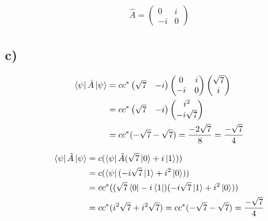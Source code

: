 \documentclass[norsk,a4paper,12pt]{article}
\begin{document}
		\begin{equation}
		\begin{aligned}
		\hat{A} = \begin{pmatrix}0 & i \\ -i & 0 \end{pmatrix}
		\end{aligned}
		\end{equation}
		
	\subsection*{c)}
	
		\begin{equation}
		\begin{aligned}
		\bra{\psi} \hat{A} \ket{\psi} &= cc^* \begin{pmatrix}\sqrt{7} & -i \end{pmatrix}
		\begin{pmatrix}0 & i \\ -i & 0 \end{pmatrix} \begin{pmatrix}\sqrt{7} \\ i \end{pmatrix} \\
		&= cc^* \begin{pmatrix}\sqrt{7} & -i \end{pmatrix}
		\begin{pmatrix}i^2 \\ -i\sqrt{7} \end{pmatrix} \\
		&= cc^* (-\sqrt{7} -\sqrt{7}) = \frac{-2\sqrt{7}}{8} = \frac{-\sqrt{7}}{4}
		\end{aligned}
		\end{equation}
		
		\begin{equation}
		\begin{aligned}
		\bra{\psi} \hat{A} \ket{\psi} &= c(\bra{\psi} \hat{A} (\sqrt{7} \ket{0} + i \ket{1})) \\
		&= c(\bra{\psi} (-i\sqrt{7} \ket{1} + i^2 \ket{0})) \\
		&= cc^*((\sqrt{7} \bra{0} - i \bra{1}) (-i\sqrt{7} \ket{1} + i^2 \ket{0})) \\
		&= cc^*(i^2\sqrt{7} + i^2\sqrt{7}) = cc^*(-\sqrt{7} - \sqrt{7}) = \frac{-\sqrt{7}}{4}
		\end{aligned}
		\end{equation}
		
\end{document}
